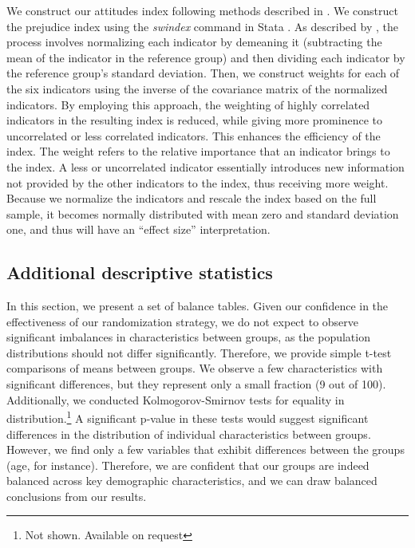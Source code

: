 \documentclass[a4paper,12pt]{article}
\begin{document}
\begin{appendix}
We construct our attitudes index following methods described in \cite{anderson2008multiple}. We construct the prejudice index using the \textit{swindex} command in Stata \citep{RePEc:boc:bocode:s458912}. As described by \cite{schwab2020constructing}, the process involves normalizing each indicator by demeaning it (subtracting the mean of the indicator in the reference group) and then dividing each indicator by the reference group's standard deviation. Then, we construct weights for each of the six indicators using the inverse of the covariance matrix of the normalized indicators. By employing this approach, the weighting of highly correlated indicators in the resulting index is reduced, while giving more prominence to uncorrelated or less correlated indicators. This enhances the efficiency of the index. The weight refers to the relative importance that an indicator brings to the index. A less or uncorrelated indicator essentially introduces new information not provided by the other indicators to the index, thus receiving more weight. Because we normalize the indicators and rescale the index based on the full sample, it becomes normally distributed with mean zero and standard deviation one, and thus will have an ``effect size'' interpretation. 

\subsection{Additional descriptive statistics} \label{sec: additional descriptives}

In this section, we present a set of balance tables. Given our confidence in the effectiveness of our randomization strategy, we do not expect to observe significant imbalances in characteristics between groups, as the population distributions should not differ significantly. Therefore, we provide simple t-test comparisons of means between groups. We observe a few characteristics with significant differences, but they represent only a small fraction (9 out of 100). Additionally, we conducted Kolmogorov-Smirnov tests for equality in distribution.\footnote{Not shown. Available on request} A significant p-value in these tests would suggest significant differences in the distribution of individual characteristics between groups. However, we find only a few variables that exhibit differences between the groups (age, for instance). Therefore, we are confident that our groups are indeed balanced across key demographic characteristics, and we can draw balanced conclusions from our results.


\end{appendix}
\end{document}
